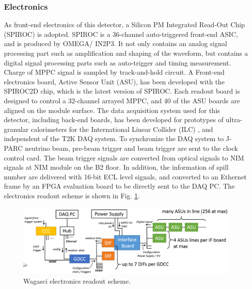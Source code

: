 \subsubsection{Electronics}
\label{sec:wagasci_elec}
As front-end electronics of this detector, a Silicon PM Integrated Read-Out Chip (SPIROC) \cite{spiroc} is adopted.
SPIROC is a 36-channel auto-triggered front-end ASIC, and is produced by OMEGA/ IN2P3. 
It not only contains an analog signal processing part such as amplification and shaping of the waveform, but contains a digital signal processing parts such as auto-trigger and timing measurement.
Charge of MPPC signal is sampled by track-and-hold circuit.
A Front-end electronics board, Active Sensor Unit (ASU), has been developed with the SPIROC2D chip, which is the latest version of SPIROC. 
Each readout board is designed to control a 32-channel arrayed MPPC, and 40 of the ASU boards are aligned on the module surface. 
The data acquisition system used for this detector, including back-end boards, has been developed for prototypes of ultra-granular calorimeters for the International Linear Collider (ILC) \cite{cal_ilc}, and independent of the T2K DAQ system.
To synchronize the DAQ system to J- PARC neutrino beam, pre-beam trigger and beam trigger are sent to the clock control card.
The beam trigger signals are converted from optical signals to NIM signals at NIM module on the B2 floor.
In addition, the information of spill number are delivered with 16-bit ECL level signals, and converted to an Ethernet frame by an FPGA evaluation board to be directly sent to the DAQ PC.
The electronics readout scheme is shown in Fig. \ref{fig:wagasci_elec_scheme}.

\begin{figure}[tbh]
\begin{center}
\includegraphics[width=1.0\linewidth]{fig/wagasci_elec_scheme.pdf}
\end{center}
\caption{
Wagasci electronics readout scheme.
}
\label{fig:wagasci_elec_scheme}
\end{figure}


